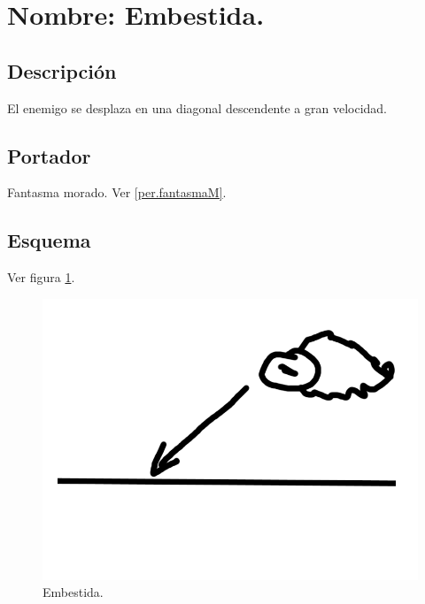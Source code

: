 	\section{Nombre: Embestida.} \label{hab.embestida}
		\subsection{Descripción}
		El enemigo se desplaza en una diagonal descendente a gran velocidad.
		\subsection{Portador}
		Fantasma morado. Ver \ref{per.fantasmaM}.
		\subsection{Esquema}
		Ver figura \ref{fig:embestida}.
		\begin{figure}
			\centering
			\includegraphics[height=0.2 \textheight]{Imagenes/embestida}
			\caption{Embestida.}
			\label{fig:embestida}
		\end{figure}